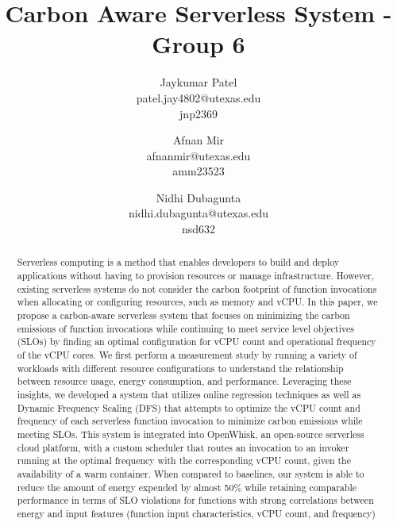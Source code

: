 \documentclass[times, 10pt,twocolumn]{article}
\begin{document}
\title{Carbon Aware Serverless System - Group 6}

\author{Jaykumar Patel\\
patel.jay4802@utexas.edu\\
jnp2369\\
\and
Afnan Mir\\
afnanmir@utexas.edu\\
amm23523\\
\and
Nidhi Dubagunta\\
nidhi.dubagunta@utexas.edu \\
nsd632\\
}



\maketitle
\thispagestyle{empty}

\begin{abstract}
   Serverless computing is a method that enables developers to build and deploy applications without having to provision resources or manage infrastructure. However, existing serverless systems do not consider the carbon footprint of function invocations when allocating or configuring resources, such as memory and vCPU. In this paper, we propose a carbon-aware serverless system that focuses on minimizing the carbon emissions of function invocations while continuing to meet service level objectives (SLOs) by finding an optimal configuration for vCPU count and operational frequency of the vCPU cores. We first perform a measurement study by running a variety of workloads with different resource configurations to understand the relationship between resource usage, energy consumption, and performance. Leveraging these insights, we developed a system that utilizes online regression techniques as well as Dynamic Frequency Scaling (DFS) that attempts to optimize 
   the vCPU count and frequency of each serverless function invocation to minimize carbon emissions while meeting SLOs. This system is integrated into OpenWhisk, an open-source serverless cloud platform, with a custom scheduler that routes an invocation to an invoker running at the optimal frequency with the corresponding vCPU count, given the availability of a warm container. When compared to baselines, our system is able to reduce the amount of energy expended by almost 50\% while retaining comparable performance in terms of SLO violations for functions with strong correlations between energy and input features (function input characteristics, vCPU count, and frequency)
\end{abstract}
\end{document}
